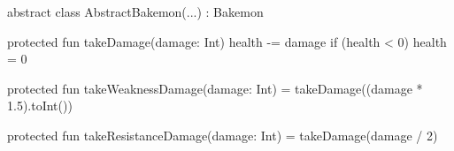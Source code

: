   \begin{kotlin}
    abstract class AbstractBakemon(...) : Bakemon {
      protected fun takeDamage(damage: Int) {
        health -= damage
        if (health < 0) {
          health = 0
        }
      }

      protected fun takeWeaknessDamage(damage: Int) = takeDamage((damage * 1.5).toInt())

      protected fun takeResistanceDamage(damage: Int) = takeDamage(damage / 2)
    }
  \end{kotlin}

